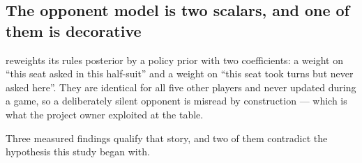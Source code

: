\subsection{The opponent model is two scalars, and one of them is decorative}
\label{sec:diag-prior}

\vfour{} reweights its rules posterior by a policy prior with two coefficients:
a weight on ``this seat asked in this half-suit'' and a weight on ``this seat took
turns but never asked here''. They are identical for all five other players and
never updated during a game, so a deliberately silent opponent is misread by
construction --- which is what the project owner exploited at the table.

Three measured findings qualify that story, and two of them contradict the
hypothesis this study began with.

